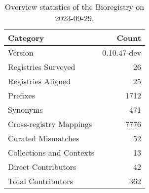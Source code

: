 \begin{table}
\caption{Overview statistics of the Bioregistry on 2023-09-29.}
\label{tab:bioregistry-summary}
\begin{tabular}{lr}
\toprule
Category & Count \\
\midrule
Version & 0.10.47-dev \\
Registries Surveyed & 26 \\
Registries Aligned & 25 \\
Prefixes & 1712 \\
Synonyms & 471 \\
Cross-registry Mappings & 7776 \\
Curated Mismatches & 52 \\
Collections and Contexts & 13 \\
Direct Contributors & 42 \\
Total Contributors & 362 \\
\bottomrule
\end{tabular}
\end{table}
